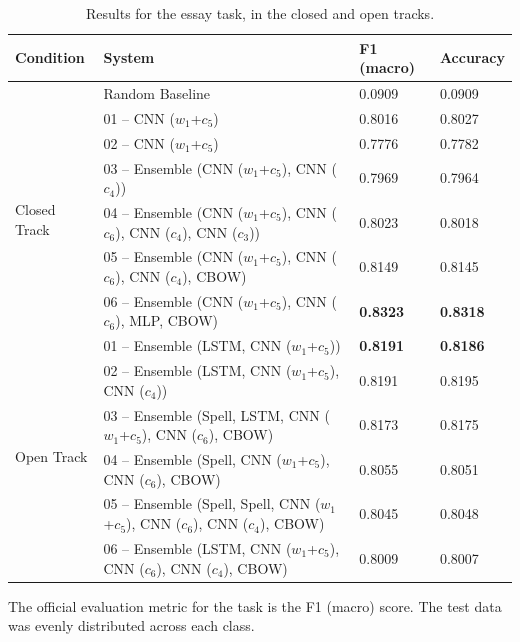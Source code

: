 \documentclass[11pt,letterpaper]{article}
\begin{document}
\begin{table}[h]
    \small
\center
\caption{Results for the essay task, in the closed and open tracks.}
\label{tab:results}
\begin{tabular}{llll}
\toprule
\bf Condition & \bf System & \bf F1 (macro) & \bf Accuracy \\
\midrule
& Random Baseline & 0.0909 & 0.0909 \\
\midrule
\multirow{6}{*}{Closed Track} & 01 -- CNN ($w_1$+$c_5$) & 0.8016 & 0.8027 \\
& 02 -- CNN ($w_1$+$c_5$) & 0.7776 & 0.7782 \\
& 03 -- Ensemble (CNN ($w_1$+$c_5$), CNN ($c_4$)) & 0.7969 & 0.7964 \\
& 04 -- Ensemble (CNN ($w_1$+$c_5$), CNN ($c_6$), CNN ($c_4$), CNN ($c_3$)) & 0.8023 & 0.8018 \\
& 05 -- Ensemble (CNN ($w_1$+$c_5$), CNN ($c_6$), CNN ($c_4$), CBOW) & 0.8149 & 0.8145 \\
& 06 -- Ensemble (CNN ($w_1$+$c_5$), CNN ($c_6$), MLP, CBOW) & \bf 0.8323 & \bf 0.8318 \\
\midrule
\multirow{6}{*}{Open Track} & 01 -- Ensemble (LSTM, CNN ($w_1$+$c_5$)) & \bf 0.8191 & \bf 0.8186 \\
& 02 -- Ensemble (LSTM, CNN ($w_1$+$c_5$), CNN ($c_4$)) & 0.8191   &  0.8195 \\
& 03 -- Ensemble (Spell, LSTM, CNN ($w_1$+$c_5$), CNN ($c_6$), CBOW) & 0.8173   &  0.8175 \\
& 04 -- Ensemble (Spell, CNN ($w_1$+$c_5$), CNN ($c_6$), CBOW) & 0.8055   &  0.8051 \\
& 05 -- Ensemble (Spell, Spell, CNN ($w_1$+$c_5$), CNN ($c_6$), CNN ($c_4$), CBOW) & 0.8045   &  0.8048 \\
& 06 -- Ensemble (LSTM, CNN ($w_1$+$c_5$), CNN ($c_6$), CNN ($c_4$), CBOW)& 0.8009   &  0.8007 \\
\bottomrule
\end{tabular}
\end{table}

The official evaluation metric for the task is the F1 (macro) score.
The test data was evenly distributed across each class.
\end{document}
